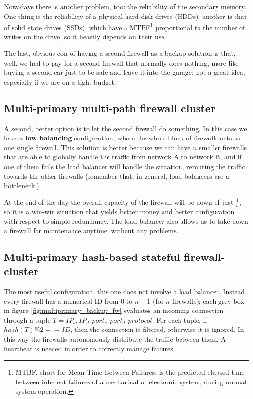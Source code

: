 Nowadays there is another problem, too: the reliability of the secondary memory. One thing is the reliability of a physical hard disk drives (HDDs), another is that of solid state drives (SSDs), which have a MTBF\footnote{MTBF, short for Mean Time Between Failures, is the predicted elapsed time between inherent failures of a mechanical or electronic system, during normal system operation.} proportional to the number of writes on the drive, so it heavily depends on their use.

The last, obvious con of having a second firewall as a backup solution is that, well, we had to pay for a second firewall that normally does nothing, more like buying a second car just to be safe and leave it into the garage: not a great idea, especially if we are on a tight budget.


\subsection{Multi-primary multi-path firewall cluster}
A second, better option is to let the second firewall do something. In this case we have a \textbf{low balancing} configuration, where the whole block of firewalls acts as one single firewall. This solution is better because we can have $n$ smaller firewalls that are able to globally handle the traffic from network A to network B, and if one of them fails the load balancer will handle the situation, rerouting the traffic towards the other firewalls (remember that, in general, load balancers are a bottleneck.).

At the end of the day the overall capacity of the firewall will be down of just $\frac{1}{n}$, so it is a win-win situation that yields better money and better configuration with respect to simple redundancy. The load balancer also allows us to take down a firewall for maintenance anytime, without any problems.


\subsection{Multi-primary hash-based stateful firewall-cluster}
The most useful configuration, this one does not involve a load balancer. Instead, every firewall has a numerical ID from $0$ to $n-1$ (for $n$ firewalls); each grey box in figure \ref{fig:multiprimary_backup_fw} evaluates an incoming connection through a tuple $T = IP_s, IP_d, port_s, port_d, protocol$. For each tuple, if $hash(T) \% 2 == ID$, then the connection is filtered, otherwise it is ignored. In this way the firewalls autonomously distribute the traffic between them. A heartbeat is needed in order to correctly manage failures.

